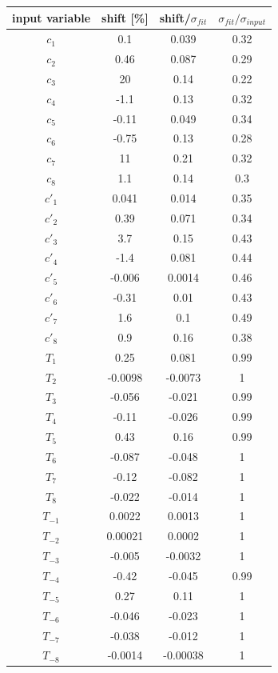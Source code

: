 \begin{table}[!h]
	\begin{center}
		\begin{tabular}{c| c| c|c}
			input variable & \quad shift [\%] \quad & shift/$\sigma_{fit}$ & \quad $\sigma_{fit}/ \sigma_{input}$\\
			\hline
			\hline
$c_1$ & 0.1 & 0.039 & 0.32\\ 
$c_2$ & 0.46 & 0.087 & 0.29\\ 
$c_3$ & 20 & 0.14 & 0.22\\ 
$c_4$ & -1.1 & 0.13 & 0.32\\ 
$c_5$ & -0.11 & 0.049 & 0.34\\ 
$c_6$ & -0.75 & 0.13 & 0.28\\ 
$c_7$ & 11 & 0.21 & 0.32\\ 
$c_8$ & 1.1 & 0.14 & 0.3\\ 
$c'_1$ & 0.041 & 0.014 & 0.35\\ 
$c'_2$ & 0.39 & 0.071 & 0.34\\ 
$c'_3$ & 3.7 & 0.15 & 0.43\\ 
$c'_4$ & -1.4 & 0.081 & 0.44\\ 
$c'_5$ & -0.006 & 0.0014 & 0.46\\ 
$c'_6$ & -0.31 & 0.01 & 0.43\\ 
$c'_7$ & 1.6 & 0.1 & 0.49\\ 
$c'_8$ & 0.9 & 0.16 & 0.38\\ 
$T_1$ & 0.25 & 0.081 & 0.99\\ 
$T_2$ & -0.0098 & -0.0073 & 1\\ 
$T_3$ & -0.056 & -0.021 & 0.99\\ 
$T_4$ & -0.11 & -0.026 & 0.99\\ 
$T_5$ & 0.43 & 0.16 & 0.99\\ 
$T_6$ & -0.087 & -0.048 & 1\\ 
$T_7$ & -0.12 & -0.082 & 1\\ 
$T_8$ & -0.022 & -0.014 & 1\\ 
$T_{-1}$ & 0.0022 & 0.0013 & 1\\ 
$T_{-2}$ & 0.00021 & 0.0002 & 1\\ 
$T_{-3}$ & -0.005 & -0.0032 & 1\\ 
$T_{-4}$ & -0.42 & -0.045 & 0.99\\ 
$T_{-5}$ & 0.27 & 0.11 & 1\\ 
$T_{-6}$ & -0.046 & -0.023 & 1\\ 
$T_{-7}$ & -0.038 & -0.012 & 1\\ 
$T_{-8}$ & -0.0014 & -0.00038 & 1\\ 

\end{tabular}
\end{center}
\end{table}
